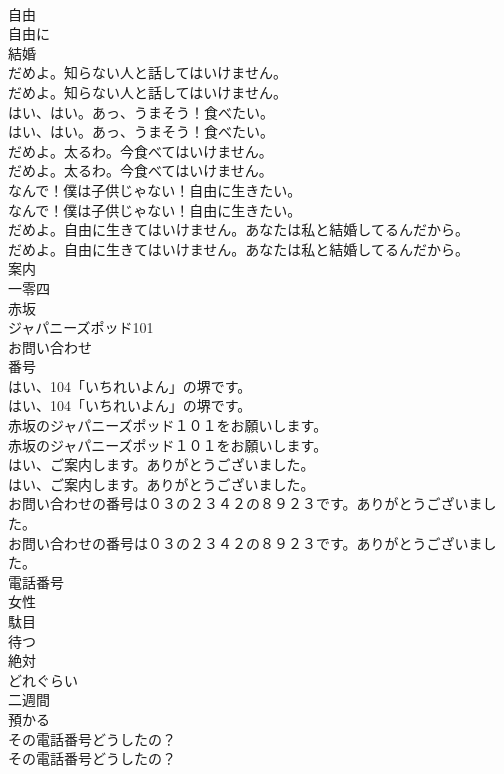 \documentclass[8pt]{extreport}
\begin{document}
\begin{CJK}{UTF8}{min}
\\	自由
\\	自由に
\\	結婚
\\	だめよ。知らない人と話してはいけません。	
\\	だめよ。知らない人と話してはいけません。 
\\	はい、はい。あっ、うまそう！食べたい。	
\\	はい、はい。あっ、うまそう！食べたい。 
\\	だめよ。太るわ。今食べてはいけません。	
\\	だめよ。太るわ。今食べてはいけません。 
\\	なんで！僕は子供じゃない！自由に生きたい。	
\\	なんで！僕は子供じゃない！自由に生きたい。 
\\	だめよ。自由に生きてはいけません。あなたは私と結婚してるんだから。	
\\	だめよ。自由に生きてはいけません。あなたは私と結婚してるんだから。 
\\	案内
\\	一零四
\\	赤坂
\\	ジャパニーズポッド101
\\	お問い合わせ
\\	番号
\\	はい、104「いちれいよん」の堺です。	
\\	はい、104「いちれいよん」の堺です。 
\\	赤坂のジャパニーズポッド１０１をお願いします。	
\\	赤坂のジャパニーズポッド１０１をお願いします。 
\\	はい、ご案内します。ありがとうございました。	
\\	はい、ご案内します。ありがとうございました。 
\\	お問い合わせの番号は０３の２３４２の８９２３です。ありがとうございました。	
\\	お問い合わせの番号は０３の２３４２の８９２３です。ありがとうございました。 
\\	電話番号
\\	女性
\\	駄目
\\	待つ
\\	絶対
\\	どれぐらい
\\	二週間
\\	預かる
\\	その電話番号どうしたの？	
\\	その電話番号どうしたの？ 

\end{CJK}
\end{document}
